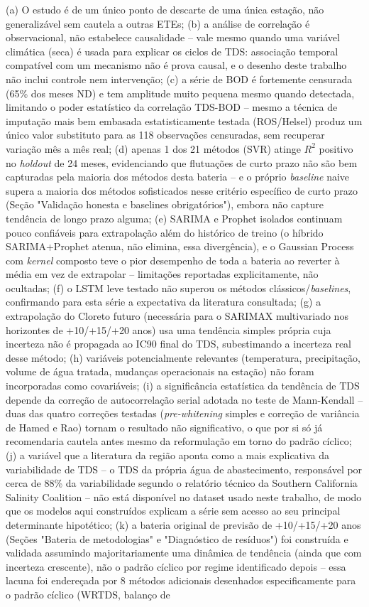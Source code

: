 (a) O estudo é de um único ponto de descarte de uma única estação, não generalizável sem cautela a outras ETEs; (b) a análise de correlação é observacional, não estabelece causalidade -- vale mesmo quando uma variável climática (seca) é usada para explicar os ciclos de TDS: associação temporal compatível com um mecanismo não é prova causal, e o desenho deste trabalho não inclui controle nem intervenção; (c) a série de BOD é fortemente censurada (65\% dos meses ND) e tem amplitude muito pequena mesmo quando detectada, limitando o poder estatístico da correlação TDS-BOD -- mesmo a técnica de imputação mais bem embasada estatisticamente testada (ROS/Helsel) produz um único valor substituto para as 118 observações censuradas, sem recuperar variação mês a mês real; (d) apenas 1 dos 21 métodos (SVR) atinge $R^2$ positivo no \textit{holdout} de 24 meses, evidenciando que flutuações de curto prazo não são bem capturadas pela maioria dos métodos desta bateria -- e o próprio \textit{baseline} naive supera a maioria dos métodos sofisticados nesse critério específico de curto prazo (Seção "Validação honesta e baselines obrigatórios"), embora não capture tendência de longo prazo alguma; (e) SARIMA e Prophet isolados continuam pouco confiáveis para extrapolação além do histórico de treino (o híbrido SARIMA+Prophet atenua, não elimina, essa divergência), e o Gaussian Process com \textit{kernel} composto teve o pior desempenho de toda a bateria ao reverter à média em vez de extrapolar -- limitações reportadas explicitamente, não ocultadas; (f) o LSTM leve testado não superou os métodos clássicos/\textit{baselines}, confirmando para esta série a expectativa da literatura consultada; (g) a extrapolação do Cloreto futuro (necessária para o SARIMAX multivariado nos horizontes de +10/+15/+20 anos) usa uma tendência simples própria cuja incerteza não é propagada ao IC90 final do TDS, subestimando a incerteza real desse método; (h) variáveis potencialmente relevantes (temperatura, precipitação, volume de água tratada, mudanças operacionais na estação) não foram incorporadas como covariáveis; (i) a significância estatística da tendência de TDS depende da correção de autocorrelação serial adotada no teste de Mann-Kendall -- duas das quatro correções testadas (\textit{pre-whitening} simples e correção de variância de Hamed e Rao) tornam o resultado não significativo, o que por si só já recomendaria cautela antes mesmo da reformulação em torno do padrão cíclico; (j) a variável que a literatura da região aponta como a mais explicativa da variabilidade de TDS -- o TDS da própria água de abastecimento, responsável por cerca de 88\% da variabilidade segundo o relatório técnico da Southern California Salinity Coalition \cite{scsc2018tds} -- não está disponível no dataset usado neste trabalho, de modo que os modelos aqui construídos explicam a série sem acesso ao seu principal determinante hipotético; (k) a bateria original de previsão de +10/+15/+20 anos (Seções "Bateria de metodologias" e "Diagnóstico de resíduos") foi construída e validada assumindo majoritariamente uma dinâmica de tendência (ainda que com incerteza crescente), não o padrão cíclico por regime identificado depois -- essa lacuna foi endereçada por 8 métodos adicionais desenhados especificamente para o padrão cíclico (WRTDS, balanço de 
